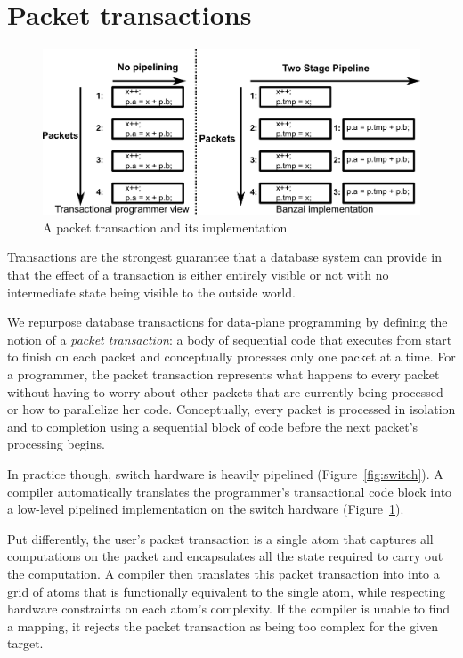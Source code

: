 \section{Packet transactions}
\begin{figure}
  \includegraphics[width=\columnwidth]{spec_vs_impl.pdf}
  \caption{A packet transaction and its implementation}
  \label{fig:trans}
\end{figure}

Transactions are the strongest guarantee that a database system can provide in
that the effect of a transaction is either entirely visible or not with no
intermediate state being visible to the outside world.

We repurpose database transactions for data-plane programming by defining the
notion of a \textit{packet transaction}: a body of sequential code that
executes from start to finish on each packet and conceptually processes only
one packet at a time. For a programmer, the packet transaction represents what
happens to every packet without having to worry about other packets that are
currently being processed or how to parallelize her code. Conceptually, every
packet is processed in isolation and to completion using a sequential block of
code before the next packet's processing begins.

In practice though, switch hardware is heavily pipelined
(Figure~\ref{fig:switch}).  A compiler automatically translates the
programmer's transactional code block into a low-level pipelined implementation
on the switch hardware (Figure~\ref{fig:trans}).

Put differently, the user's packet transaction is a single atom that captures
all computations on the packet and encapsulates all the state required to carry
out the computation.  A compiler then translates this packet transaction into
into a grid of atoms that is functionally equivalent to the single atom, while
respecting hardware constraints on each atom's complexity. If the compiler is
unable to find a mapping, it rejects the packet transaction as being too
complex for the given target.

